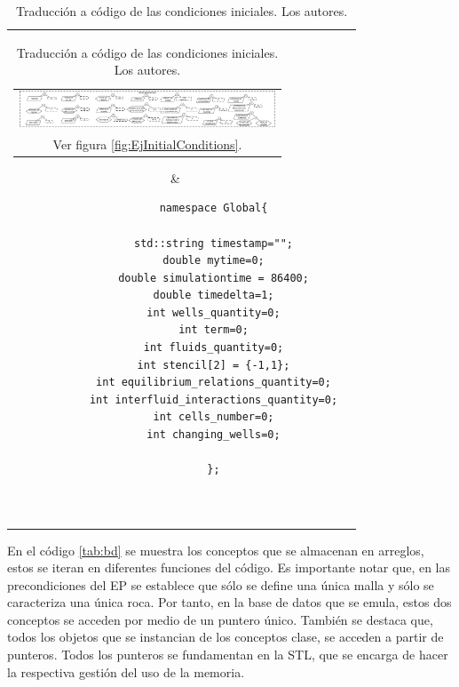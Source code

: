 \begin{table}[h]
	\centering
	\begin{tabular}{cc}
		\parbox[c]{10em}{
			\begin{tabular}[c]{@{}c@{}}\includegraphics[width=3in]{Fig/EjInitialConditions.pdf}\\ Ver figura \ref{fig:EjInitialConditions}.\end{tabular}
		}
		&
		\begin{tiny}
			\begin{lstlisting}
			namespace Global{
			
			std::string timestamp="";
			double mytime=0;
			double simulationtime = 86400;
			double timedelta=1;
			int wells_quantity=0;
			int term=0;
			int fluids_quantity=0;
			int stencil[2] = {-1,1};
			int equilibrium_relations_quantity=0;
			int interfluid_interactions_quantity=0;
			int cells_number=0;
			int changing_wells=0;
			
			};
			
			
			\end{lstlisting}
		\end{tiny}
	\end{tabular}
	\label{tab:InitialConditions}
	\caption[Traducción a código de las condiciones iniciales.]{Traducción a código de las condiciones iniciales. Los autores.}
\end{table}

En el código \ref{tab:bd} se muestra los conceptos que se almacenan en arreglos, estos se iteran en diferentes funciones del código. Es importante notar que, en las precondiciones del EP se establece que sólo se define una única malla y sólo se caracteriza una única roca. Por tanto, en la base de datos que se emula, estos dos conceptos se acceden por medio de un puntero único. También se destaca que, todos los objetos que se instancian de los conceptos clase, se acceden a partir de punteros. Todos los punteros se fundamentan en la STL, que se encarga de hacer la respectiva gestión del uso de la memoria.\\

